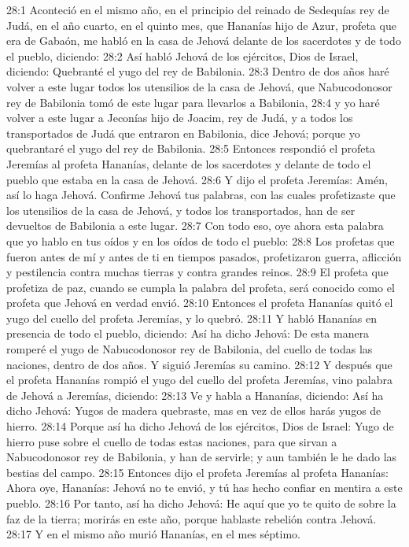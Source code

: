 28:1 Aconteció en el mismo año, en el principio del reinado de Sedequías rey de Judá, en el año cuarto, en el quinto mes, que Hananías hijo de Azur, profeta que era de Gabaón, me habló en la casa de Jehová delante de los sacerdotes y de todo el pueblo, diciendo: 
28:2 Así habló Jehová de los ejércitos, Dios de Israel, diciendo: Quebranté el yugo del rey de Babilonia. 
28:3 Dentro de dos años haré volver a este lugar todos los utensilios de la casa de Jehová, que Nabucodonosor rey de Babilonia tomó de este lugar para llevarlos a Babilonia, 
28:4 y yo haré volver a este lugar a Jeconías hijo de Joacim, rey de Judá, y a todos los transportados de Judá que entraron en Babilonia, dice Jehová; porque yo quebrantaré el yugo del rey de Babilonia. 
28:5 Entonces respondió el profeta Jeremías al profeta Hananías, delante de los sacerdotes y delante de todo el pueblo que estaba en la casa de Jehová. 
28:6 Y dijo el profeta Jeremías: Amén, así lo haga Jehová. Confirme Jehová tus palabras, con las cuales profetizaste que los utensilios de la casa de Jehová, y todos los transportados, han de ser devueltos de Babilonia a este lugar. 
28:7 Con todo eso, oye ahora esta palabra que yo hablo en tus oídos y en los oídos de todo el pueblo: 
28:8 Los profetas que fueron antes de mí y antes de ti en tiempos pasados, profetizaron guerra, aflicción y pestilencia contra muchas tierras y contra grandes reinos. 
28:9 El profeta que profetiza de paz, cuando se cumpla la palabra del profeta, será conocido como el profeta que Jehová en verdad envió. 
28:10 Entonces el profeta Hananías quitó el yugo del cuello del profeta Jeremías, y lo quebró. 
28:11 Y habló Hananías en presencia de todo el pueblo, diciendo: Así ha dicho Jehová: De esta manera romperé el yugo de Nabucodonosor rey de Babilonia, del cuello de todas las naciones, dentro de dos años. Y siguió Jeremías su camino. 
28:12 Y después que el profeta Hananías rompió el yugo del cuello del profeta Jeremías, vino palabra de Jehová a Jeremías, diciendo: 
28:13 Ve y habla a Hananías, diciendo: Así ha dicho Jehová: Yugos de madera quebraste, mas en vez de ellos harás yugos de hierro. 
28:14 Porque así ha dicho Jehová de los ejércitos, Dios de Israel: Yugo de hierro puse sobre el cuello de todas estas naciones, para que sirvan a Nabucodonosor rey de Babilonia, y han de servirle; y aun también le he dado las bestias del campo. 
28:15 Entonces dijo el profeta Jeremías al profeta Hananías: Ahora oye, Hananías: Jehová no te envió, y tú has hecho confiar en mentira a este pueblo. 
28:16 Por tanto, así ha dicho Jehová: He aquí que yo te quito de sobre la faz de la tierra; morirás en este año, porque hablaste rebelión contra Jehová. 
28:17 Y en el mismo año murió Hananías, en el mes séptimo. 

